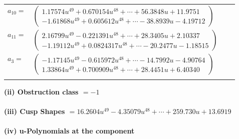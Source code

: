 \documentclass[1p]{elsarticle_modified}
\theoremstyle{definition}
\begin{document}
\begin{tabular}{m{7pt} m{180pt} m{7pt} m{180pt} }
\flushright $a_{10}=$&$\begin{pmatrix}1.17574 u^{49}+0.670154 u^{48}+\cdots+56.3848 u+11.9751\\-1.61868 u^{49}+0.605612 u^{48}+\cdots-38.8939 u-4.19712\end{pmatrix}$ \\
\flushright $a_{11}=$&$\begin{pmatrix}2.16799 u^{49}-0.221391 u^{48}+\cdots+28.3405 u+2.10337\\-1.19112 u^{49}+0.0824317 u^{48}+\cdots-20.2477 u-1.18515\end{pmatrix}$ \\
\flushright $a_{3}=$&$\begin{pmatrix}-1.17145 u^{49}-0.615972 u^{48}+\cdots-14.7992 u-4.90764\\1.33864 u^{49}+0.700909 u^{48}+\cdots+28.4451 u+6.40340\end{pmatrix}$\\&\end{tabular}
\flushleft \textbf{(ii) Obstruction class $= -1$}\\~\\
\flushleft \textbf{(iii) Cusp Shapes $= 16.2604 u^{49}-4.35079 u^{48}+\cdots+259.730 u+13.6919$}\\~\\
\newpage\renewcommand{\arraystretch}{1}
\flushleft \textbf{(iv) u-Polynomials at the component}\newline \\
\end{document}

